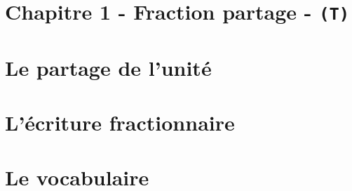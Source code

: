 



\horrule{2px}
\section*{Chapitre 1 - Fraction partage - \texttt{(T)}}
\horrule{2px}

\section*{Le partage de l'unité}

\section*{L'écriture fractionnaire}

\section*{Le vocabulaire}



